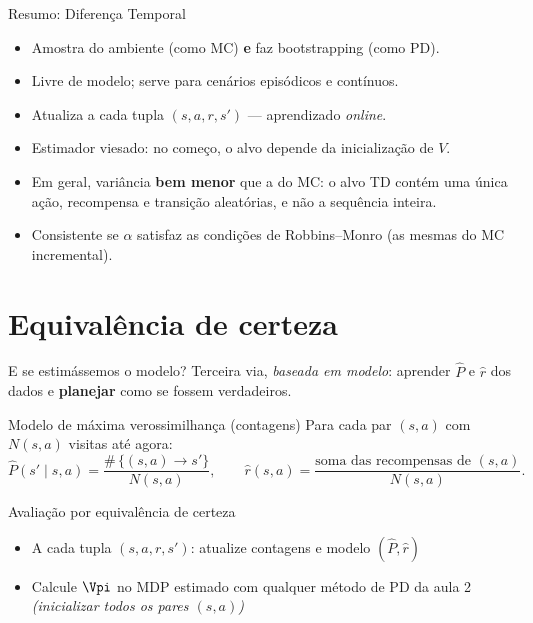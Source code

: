 \documentclass[aspectratio=169, 11pt]{beamer}
\begin{document}
\begin{frame}{Resumo: Diferença Temporal}
  \begin{itemize}
    \item Amostra do ambiente (como MC) \textbf{e} faz bootstrapping (como PD).
    \item Livre de modelo; serve para cenários episódicos e contínuos.
    \item Atualiza a cada tupla $(s, a, r, s')$ — aprendizado \emph{online}.
    \item Estimador \alert{viesado}: no começo, o alvo depende da
      inicialização de $V$.
    \item Em geral, variância \textbf{bem menor} que a do MC: o alvo TD
      contém uma única ação, recompensa e transição aleatórias, e não a
      sequência inteira.
    \item Consistente se $\alpha$ satisfaz as condições de Robbins–Monro
      (as mesmas do MC incremental).
  \end{itemize}
\end{frame}

\section{Equivalência de certeza}

\begin{frame}{E se estimássemos o modelo?}
  Terceira via, \emph{baseada em modelo}: aprender $\hat{P}$ e $\hat{r}$
  dos dados e \textbf{planejar} como se fossem verdadeiros.

  \begin{defbox}{Modelo de máxima verossimilhança (contagens)}
    Para cada par $(s,a)$ com $N(s,a)$ visitas até agora:
    \[
      \hat{P}(s' \mid s, a) = \frac{\#\,\{(s,a) \to s'\}}{N(s,a)},
      \qquad
      \hat{r}(s, a) = \frac{\text{soma das recompensas de } (s,a)}{N(s,a)}.
    \]
  \end{defbox}

  \begin{algbox}{Avaliação por equivalência de certeza}
    \begin{itemize}\setlength{\itemsep}{0.2ex}
      \item A cada tupla $(s, a, r, s')$: atualize contagens e modelo
        $(\hat{P}, \hat{r})$
      \item Calcule $\Vpi$ no MDP estimado com qualquer método de PD da
        aula 2 \emph{(inicializar todos os pares $(s,a)$)}
    \end{itemize}
  \end{algbox}
\end{frame}
\end{document}

